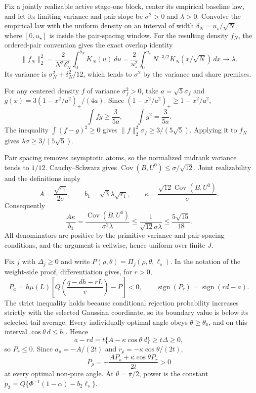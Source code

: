 Fix a jointly realizable active stage-one block, center its empirical baseline law, and let its limiting variance and pair slope be \(\sigma^2>0\) and \(\lambda>0\).  Convolve the empirical law with the uniform density on an interval of width \(\delta_N=u_\star/\sqrt N\), where \([0,u_\star]\) is inside the pair-spacing window.  For the resulting density \(f_N\), the ordered-pair convention gives the exact overlap identity
\[
\|f_N\|_2^2
=\frac{2}{N^2\delta_N^2}\int_0^{\delta_N}K_N(u)\,du
=\frac{2}{u_\star^2}\int_0^{u_\star}N^{-3/2}K_N(x/\sqrt N)\,dx
\longrightarrow\lambda.
\]
Its variance is \(\sigma_N^2+\delta_N^2/12\), which tends to \(\sigma^2\) by the variance and share premises.

For any centered density \(f\) of variance \(\sigma_f^2>0\), take \(a=\sqrt5\sigma_f\) and \(g(x)=3(1-x^2/a^2)_+/(4a)\).  Since \((1-x^2/a^2)_+\ge1-x^2/a^2\),
\[
\int fg\ge\frac{3}{5a},
\qquad
\int g^2=\frac{3}{5a}.
\]
The inequality \(\int(f-g)^2\ge0\) gives \(\|f\|_2^2\sigma_f\ge3/(5\sqrt5)\).  Applying it to \(f_N\) gives \(\lambda\sigma\ge3/(5\sqrt5)\).

Pair spacing removes asymptotic atoms, so the normalized midrank variance tends to \(1/12\).  Cauchy--Schwarz gives \(\operatorname{Cov}(B,U^0)\le\sigma/\sqrt{12}\).  Joint realizability and the definitions imply
\[
A=\frac{\sqrt{r_1}}{2\sigma},\qquad
b_1=\sqrt3\lambda\sqrt{r_1},\qquad
\kappa=\frac{\sqrt{12}\operatorname{Cov}(B,U^0)}\sigma.
\]
Consequently
\[
\frac{A\kappa}{b_1}
=\frac{\operatorname{Cov}(B,U^0)}{\sigma^2\lambda}
\le\frac{1}{\sqrt{12}\sigma\lambda}
\le\frac{5\sqrt{15}}{18}.
\]
All denominators are positive by the primitive variance and pair-spacing conditions, and the argument is cellwise, hence uniform over finite \(J\).

Fix \(j\) with \(\Delta_j\ge0\) and write \(P(\rho,\theta)=\Pi_j(\rho,\theta,\ell_s)\).  In the notation of the weight-side proof, differentiation gives, for \(r>0\),
\[
P_a=h\mu(L)\left[Q\!\left(\frac{q-dh-rL}{v}\right)-P\right]<0,
\qquad
\operatorname{sign}(P_r)=\operatorname{sign}(rd-a).
\]
The strict inequality holds because conditional rejection probability increases strictly with the selected Gaussian coordinate, so its boundary value is below its selected-tail average.  Every individually optimal angle obeys \(\theta\ge\theta_0\), and on this interval \(\cos\theta\,d\le b_1\).  Hence
\[
a-rd=t\{A-\kappa\cos\theta\,d\}\ge t\Delta\ge0,
\]
so \(P_r\le0\).  Since \(a_\rho=-A/(2t)\) and \(r_\rho=-\kappa\cos\theta/(2t)\),
\[
P_\rho=-\frac{AP_a+\kappa\cos\theta P_r}{2t}>0
\]
at every optimal non-pure angle.  At \(\theta=\pi/2\), power is the constant \(p_2=Q\{\Phi^{-1}(1-\alpha)-b_2\ell_s\}\).

